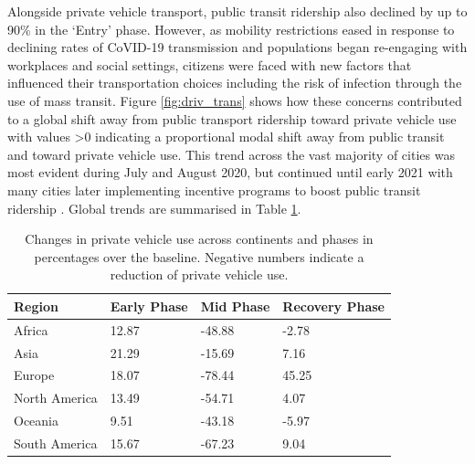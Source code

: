 \documentclass[preprint,12pt]{elsarticle}
\begin{document}
Alongside private vehicle transport, public transit ridership also declined by up to 90\% in the `Entry' phase\cite{TransitCovid_Gkiotsalitis}. However, as mobility restrictions eased in response to declining rates of CoVID-19 transmission and populations began re-engaging with workplaces and social settings, citizens were faced with new factors that influenced their transportation choices including the risk of infection through the use of mass transit\cite{BECKTransit}. Figure \ref{fig:driv_trans} shows how these concerns contributed to a global shift away from public transport ridership toward private vehicle use with values \textgreater 0 indicating a proportional modal shift away from public transit and toward private vehicle use. This trend across the vast majority of cities was most evident during July and August 2020, but continued until early 2021 with many cities later implementing incentive programs to boost public transit ridership \cite{dai2021improving}. Global trends are summarised in Table \ref{tab:driving}.

\begin{table}
\caption{Changes in private vehicle use across continents and phases in percentages over the baseline. Negative numbers indicate a reduction of private vehicle use.}
\begin{tabular}{ |l|l|l|l| }
\hline
\textbf{Region} & \textbf{Early Phase} & \textbf{Mid Phase} & \textbf{Recovery Phase}  \\ 
\hline
Africa         & \cellcolor{red!12}12.87 & \cellcolor{blue!15}-48.88 & \cellcolor{blue!10}-2.78  \\ \hline
Asia           & \cellcolor{red!15}21.29 & \cellcolor{blue!10}-15.69 & \cellcolor{red!10} 7.16  \\ \hline
Europe         & \cellcolor{red!13}18.07 & \cellcolor{blue!20}-78.44 & \cellcolor{red!25} 45.25  \\ \hline
North America  & \cellcolor{red!12}13.49 & \cellcolor{blue!16}-54.71 & \cellcolor{red!10}4.07  \\ \hline
Oceania        &  \cellcolor{red!10}9.51 & \cellcolor{blue!15}-43.18 & \cellcolor{blue!10}-5.97  \\ \hline
South America  & \cellcolor{red!12}15.67 & \cellcolor{blue!18}-67.23 & \cellcolor{red!10}9.04  \\ \hline
\end{tabular}\label{tab:driving}
\end{table}
\end{document}

